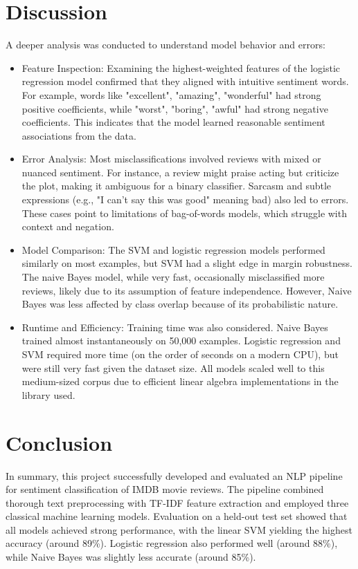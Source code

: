 \documentclass{article}
\begin{document}
\section{Discussion}
A deeper analysis was conducted to understand model behavior and errors:
\begin{itemize}
\item Feature Inspection: Examining the highest-weighted features of the logistic regression model confirmed that they aligned with intuitive sentiment words. For example, words like "excellent", "amazing", "wonderful" had strong positive coefficients, while "worst", "boring", "awful" had strong negative coefficients. This indicates that the model learned reasonable sentiment associations from the data.
\item Error Analysis: Most misclassifications involved reviews with mixed or nuanced sentiment. For instance, a review might praise acting but criticize the plot, making it ambiguous for a binary classifier. Sarcasm and subtle expressions (e.g., "I can't say this was good" meaning bad) also led to errors. These cases point to limitations of bag-of-words models, which struggle with context and negation.
\item Model Comparison: The SVM and logistic regression models performed similarly on most examples, but SVM had a slight edge in margin robustness. The naive Bayes model, while very fast, occasionally misclassified more reviews, likely due to its assumption of feature independence. However, Naive Bayes was less affected by class overlap because of its probabilistic nature.
\item Runtime and Efficiency: Training time was also considered. Naive Bayes trained almost instantaneously on 50,000 examples. Logistic regression and SVM required more time (on the order of seconds on a modern CPU), but were still very fast given the dataset size. All models scaled well to this medium-sized corpus due to efficient linear algebra implementations in the library used.
\end{itemize}

\newpage

\section{Conclusion}
In summary, this project successfully developed and evaluated an NLP pipeline for sentiment classification of IMDB movie reviews. The pipeline combined thorough text preprocessing with TF-IDF feature extraction and employed three classical machine learning models. Evaluation on a held-out test set showed that all models achieved strong performance, with the linear SVM yielding the highest accuracy (around 89\%). Logistic regression also performed well (around 88\%), while Naive Bayes was slightly less accurate (around 85\%). 
\end{document}
